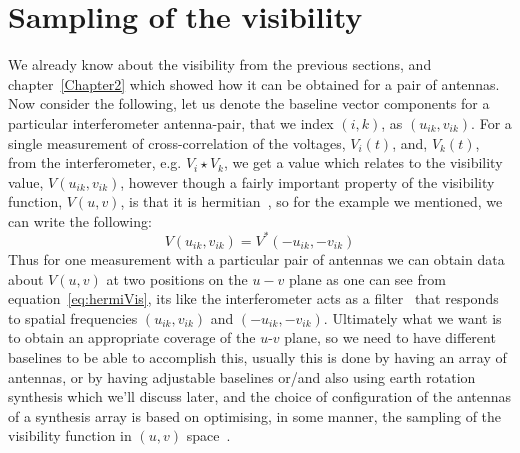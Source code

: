 \section{Sampling of the visibility}
We already know about the visibility from the previous sections, and chapter~\ref{Chapter2} which showed how it can be obtained for a pair of antennas. Now consider the following, let us denote the baseline vector components for a particular interferometer antenna-pair, that we index $(i,k)$, as $(u_{ik},v_{ik})$. For a single measurement of cross-correlation of the voltages, $V_i(t)$, and, $V_k(t)$, from the interferometer, e.g. $V_i{\star}V_k$, we get a value which relates to the visibility value, $V(u_{ik},v_{ik})$, however though a fairly important property of the visibility function, $V(u,v)$, is that it is hermitian~\citep[Pg. 138,~Sec.~5.4]{thompson2008interferometry}, so for the example we mentioned, we can write the following:
\begin{equation}
\label{eq:hermiVis}
V(u_{ik},v_{ik}) = V^{*}(-u_{ik},-v_{ik})
\end{equation}
Thus for one measurement with a particular pair of antennas we can obtain data about $V(u,v)$ at two positions on the $u-v$ plane as one can see from equation~\ref{eq:hermiVis}, its like the interferometer acts as a filter~\citep[Pg. 133,~Sec.~5.3]{thompson2008interferometry} that responds to spatial frequencies $(u_{ik},v_{ik})$ and $(-u_{ik},-v_{ik})$. Ultimately what we want is to obtain an appropriate coverage of the  $u$-$v$ plane, so we need to have different baselines to be able to accomplish this, usually this is done by having an array of antennas, or by having adjustable baselines or/and also using earth rotation synthesis which we'll discuss later, and the choice of configuration of the antennas of a synthesis array is based on optimising, in some manner, the sampling of the visibility function in $(u,v)$ space~\citep[Pg. 126,~Sec.~5.2]{thompson2008interferometry}.\\

